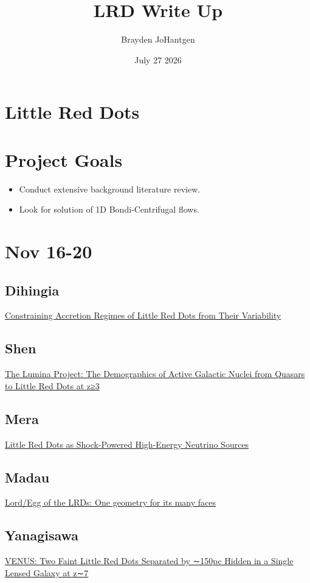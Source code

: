 \documentclass{article}
\title{LRD Write Up}
\author{Brayden JoHantgen}
\date{July 27 2026}
\begin{document}
\maketitle

\section*{Little Red Dots}


\section*{Project Goals}
\begin{itemize}
    \item Conduct extensive background literature review.
    \item Look for solution of 1D Bondi-Centrifugal flows.
\end{itemize}

\section*{Nov 16-20}

\subsection*{Dihingia}
\href{https://arxiv.org/abs/2611.18153}{Constraining Accretion Regimes of Little Red Dots from Their Variability}

\subsection*{Shen}
\href{https://arxiv.org/abs/2605.24112}{The Lumina Project: The Demographics of Active Galactic Nuclei from Quasars to Little Red Dots at z≥3}

\subsection*{Mera}
\href{https://arxiv.org/abs/2608.28975}{Little Red Dots as Shock-Powered High-Energy Neutrino Sources}

\subsection*{Madau}
\href{https://arxiv.org/abs/2611.22316}{Lord/Egg of the LRDs: One geometry for its many faces}

\subsection*{Yanagisawa}
\href{https://arxiv.org/abs/2601.06015}{VENUS: Two Faint Little Red Dots Separated by ∼150pc Hidden in a Single Lensed Galaxy at z∼7}
\end{document}
